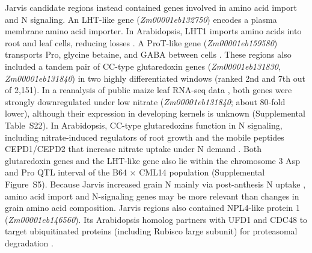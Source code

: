 \documentclass[namedate,unnumsec,webpdf,contemporary,large]{oup-authoring-template}
\begin{document}
Jarvis candidate regions instead contained genes involved in amino acid import and N signaling. An LHT-like gene (\textit{Zm00001eb132750}) encodes a plasma membrane amino acid importer. In Arabidopsis, LHT1 imports amino acids into root and leaf cells, reducing losses \citep{Fan2023LHT}. A ProT-like gene (\textit{Zm00001eb159580}) transports Pro, glycine betaine, and GABA between cells \citep{Lehmann2011ProT}. These regions also included a tandem pair of CC-type glutaredoxin genes (\textit{Zm00001eb131830}, \textit{Zm00001eb131840}) in two highly differentiated windows (ranked 2nd and 7th out of 2,151). In a reanalysis of public maize leaf RNA-seq data \citep{Mu2017LN, Guo2022LN, Ma2021LN, TorresRodriguez2021LN, AlonsoNieves2022LN, Wang2025NRT25}, both genes were strongly downregulated under low nitrate (\textit{Zm00001eb131840}; about 80-fold lower), although their expression in developing kernels is unknown (Supplemental Table~S22). In Arabidopsis, CC-type glutaredoxins function in N signaling, including nitrate-induced regulators of root growth and the mobile peptides CEPD1/CEPD2 that increase nitrate uptake under N demand \citep{Patterson2016GRX, Ohkubo2017CEPD}. Both glutaredoxin genes and the LHT-like gene also lie within the chromosome 3 Asp and Pro QTL interval of the B64 $\times$ CML14 population (Supplemental Figure~S5). Because Jarvis increased grain N mainly via post-anthesis N uptake \citep{Moll1994}, amino acid import and N-signaling genes may be more relevant than changes in grain amino acid composition. Jarvis regions also contained NPL4-like protein 1 (\textit{Zm00001eb146560}). Its Arabidopsis homolog partners with UFD1 and CDC48 to target ubiquitinated proteins (including Rubisco large subunit) for proteasomal degradation \citep{Li2022CDC48}.
\end{document}
